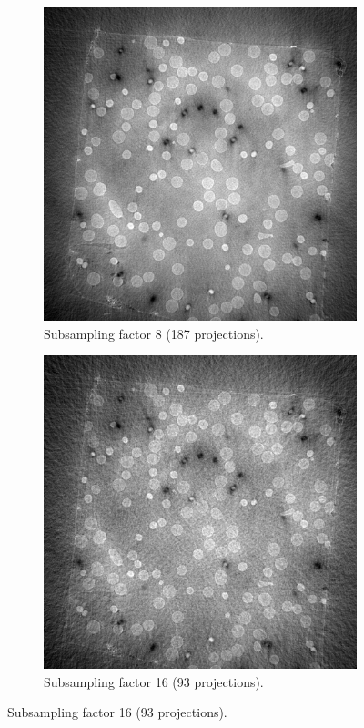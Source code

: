 \begin{figure}
  \begin{subfigure}[t]{.45\textwidth}
    \centering
    \includegraphics[width=\linewidth]{figures/ns8.png}
    \caption{Subsampling factor 8 (187 projections). }
  \end{subfigure}
  \hfill
  \begin{subfigure}[t]{.45\textwidth}
    \centering
    \includegraphics[width=\linewidth]{figures/ns16.png}
    \caption{Subsampling factor 16 (93 projections). }
  \end{subfigure}


\end{figure}
